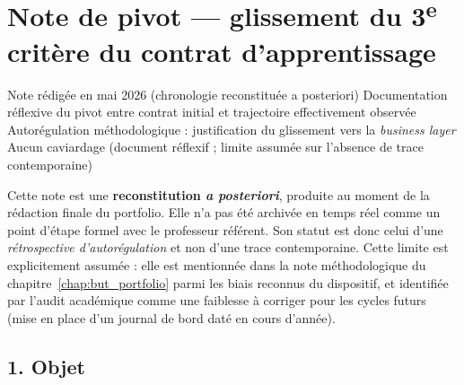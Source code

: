 
\chapter{Note de pivot --- glissement du 3\textsuperscript{e} critère du contrat d'apprentissage}
\label{annex:note-pivot}

\annexefiche
  {Note rédigée en mai 2026 (chronologie reconstituée a posteriori)}
  {Documentation réflexive du pivot entre contrat initial et trajectoire effectivement observée}
  {Autorégulation méthodologique : justification du glissement vers la \textit{business layer}}
  {Aucun caviardage (document réflexif ; limite assumée sur l'absence de trace contemporaine)}

\begin{tcolorbox}[colback=yellow!8, colframe=orange!70!black, boxrule=0.5pt, arc=3pt,
  left=8pt, right=8pt, top=6pt, bottom=6pt,
  title={\textbf{\small Statut de cette annexe}},
  fonttitle=\small\bfseries, coltitle=white, attach boxed title to top left={yshift=-2mm, xshift=4mm},
  boxed title style={colback=orange!70!black, arc=3pt, boxrule=0pt}]
\small
Cette note est une \textbf{reconstitution \emph{a posteriori}}, produite au moment de la rédaction finale du portfolio. Elle n'a pas été archivée en temps réel comme un point d'étape formel avec le professeur référent. Son statut est donc celui d'une \emph{rétrospective d'autorégulation} et non d'une trace contemporaine. Cette limite est explicitement assumée : elle est mentionnée dans la note méthodologique du chapitre~\ref{chap:but_portfolio} parmi les biais reconnus du dispositif, et identifiée par l'audit académique comme une faiblesse à corriger pour les cycles futurs (mise en place d'un journal de bord daté en cours d'année).
\end{tcolorbox}

\bigskip

\section*{1. Objet}

